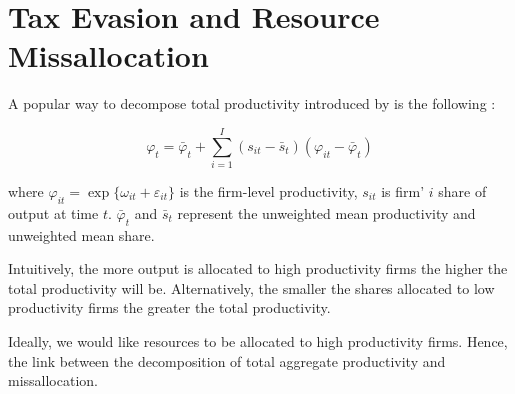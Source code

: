 \documentclass[
  12pt]{article}
\theoremstyle{definition}
\theoremstyle{remark}
\begin{document}
\begin{table}

\caption{\label{tbl-sp-deconv}Semiparametric Deconvolution of Tax
Evasion using Penalized B-Splines. The error density function is assumed
to be normally distributed with mean and variance obtained from the
residuals of the first stage conditional on firms beign Non-Evaders.}


\end{table}%

\section{Tax Evasion and Resource
Missallocation}\label{tax-evasion-and-resource-missallocation}

A popular way to decompose total productivity introduced by
\citet{Olley1996} is the following :

\[
\varphi_t = \bar\varphi_t + \sum_{i=1}^I \left(s_{it}-\bar s_{t}\right)\left(\varphi_{it}-\bar\varphi_t\right)
\]

where \(\varphi_{it}=\exp\{\omega_{it}+\varepsilon_{it}\}\) is the
firm-level productivity, \(s_{it}\) is firm' \(i\) share of output at
time \(t\). \(\bar\varphi_t\) and \(\bar s_t\) represent the unweighted
mean productivity and unweighted mean share.

Intuitively, the more output is allocated to high productivity firms the
higher the total productivity will be. Alternatively, the smaller the
shares allocated to low productivity firms the greater the total
productivity.

Ideally, we would like resources to be allocated to high productivity
firms. Hence, the link between the decomposition of total aggregate
productivity and missallocation.
\end{document}
